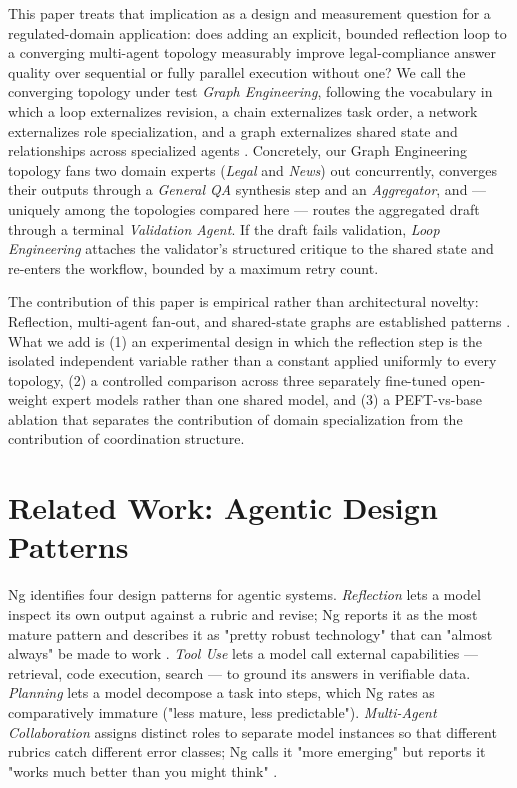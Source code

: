 \documentclass[journal,10pt,compsoc,onecolumn]{IEEEtran}
\begin{document}
This paper treats that implication as a design and measurement question for a regulated-domain application: does adding an explicit, bounded reflection loop to a converging multi-agent topology measurably improve legal-compliance answer quality over sequential or fully parallel execution without one? We call the converging topology under test \textit{Graph Engineering}, following the vocabulary in which a loop externalizes revision, a chain externalizes task order, a network externalizes role specialization, and a graph externalizes shared state and relationships across specialized agents \cite{ng_playbook_2026}. Concretely, our Graph Engineering topology fans two domain experts (\textit{Legal} and \textit{News}) out concurrently, converges their outputs through a \textit{General QA} synthesis step and an \textit{Aggregator}, and --- uniquely among the topologies compared here --- routes the aggregated draft through a terminal \textit{Validation Agent}. If the draft fails validation, \textit{Loop Engineering} attaches the validator's structured critique to the shared state and re-enters the workflow, bounded by a maximum retry count.

The contribution of this paper is empirical rather than architectural novelty: Reflection, multi-agent fan-out, and shared-state graphs are established patterns \cite{schluntz_zhang_2024, madaan_selfrefine_2023, shinn_reflexion_2023}. What we add is (1) an experimental design in which the reflection step is the isolated independent variable rather than a constant applied uniformly to every topology, (2) a controlled comparison across three separately fine-tuned open-weight expert models rather than one shared model, and (3) a PEFT-vs-base ablation that separates the contribution of domain specialization from the contribution of coordination structure.

\section{Related Work: Agentic Design Patterns}
Ng identifies four design patterns for agentic systems. \textit{Reflection} lets a model inspect its own output against a rubric and revise; Ng reports it as the most mature pattern and describes it as "pretty robust technology" that can "almost always" be made to work \cite{ng_playbook_2026}. \textit{Tool Use} lets a model call external capabilities --- retrieval, code execution, search --- to ground its answers in verifiable data. \textit{Planning} lets a model decompose a task into steps, which Ng rates as comparatively immature ("less mature, less predictable"). \textit{Multi-Agent Collaboration} assigns distinct roles to separate model instances so that different rubrics catch different error classes; Ng calls it "more emerging" but reports it "works much better than you might think" \cite{ng_playbook_2026}.
\end{document}
